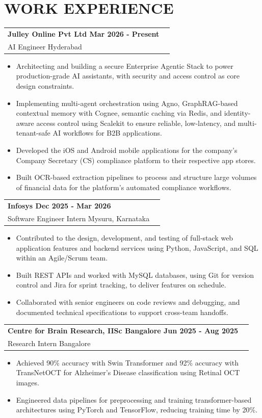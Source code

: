 \documentclass[a4paper,9.5pt]{extarticle}
\makeatletter
\newcommand{\resumeSubheading}[4]{
  \vspace{1.8pt}\nopagebreak[3]
  \begin{tabular*}{1.0\textwidth}[t]{l@{\extracolsep{\fill}}r}
    \textbf{#1} & \textit{\small #2} \\[-1.5pt]
    {\small #3} & \textit{\small #4}
  \end{tabular*}\nopagebreak[4]
}
\makeatother
\begin{document}
\section{WORK EXPERIENCE}
\resumeSubheading
  {Julley Online Pvt Ltd Mar 2026 - Present}{}
  {AI Engineer Hyderabad}{}
\nopagebreak[4]
\begin{itemize}[leftmargin=1.2em, itemsep=0.3pt, parsep=0pt, topsep=0.8pt, partopsep=0pt, label=\textbullet]
  \item Architecting and building a secure Enterprise Agentic Stack to power production-grade AI assistants, with security and access control as core design constraints.
  \item Implementing multi-agent orchestration using Agno, GraphRAG-based contextual memory with Cognee, semantic caching via Redis, and identity-aware access control using Scalekit to ensure reliable, low-latency, and multi-tenant-safe AI workflows for B2B applications.
  \item Developed the iOS and Android mobile applications for the company's Company Secretary (CS) compliance platform to their respective app stores.
  \item Built OCR-based extraction pipelines to process and structure large volumes of financial data for the platform's automated compliance workflows.
\end{itemize}
\resumeSubheading
  {Infosys Dec 2025 - Mar 2026}{}
  {Software Engineer Intern Mysuru, Karnataka}{}
\nopagebreak[4]
\begin{itemize}[leftmargin=1.2em, itemsep=0.3pt, parsep=0pt, topsep=0.8pt, partopsep=0pt, label=\textbullet]
  \item Contributed to the design, development, and testing of full-stack web application features and backend services using Python, JavaScript, and SQL within an Agile/Scrum team.
  \item Built REST APIs and worked with MySQL databases, using Git for version control and Jira for sprint tracking, to deliver features on schedule.
  \item Collaborated with senior engineers on code reviews and debugging, and documented technical specifications to support cross-team handoffs.
\end{itemize}
\resumeSubheading
  {Centre for Brain Research, IISc Bangalore Jun 2025 - Aug 2025}{}
  {Research Intern Bangalore}{}
\nopagebreak[4]
\begin{itemize}[leftmargin=1.2em, itemsep=0.3pt, parsep=0pt, topsep=0.8pt, partopsep=0pt, label=\textbullet]
  \item Achieved 90\% accuracy with Swin Transformer and 92\% accuracy with TransNetOCT for Alzheimer's Disease classification using Retinal OCT images.
  \item Engineered data pipelines for preprocessing and training transformer-based architectures using PyTorch and TensorFlow, reducing training time by 20\%.
\end{itemize}
\end{document}
